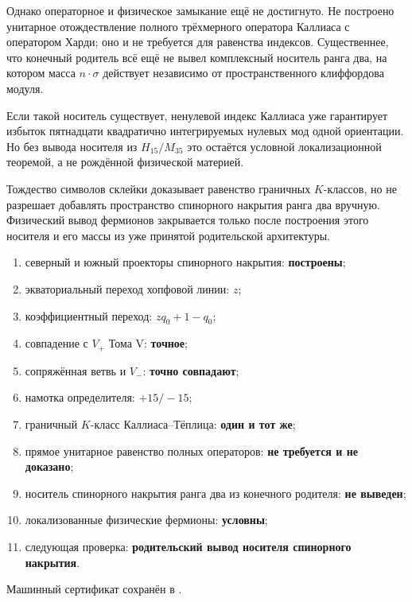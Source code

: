 Однако операторное и физическое замыкание ещё не достигнуто. Не построено
унитарное отождествление полного трёхмерного оператора Каллиаса с
оператором Харди; оно и не требуется для равенства индексов. Существеннее,
что конечный родитель всё ещё не вывел комплексный носитель ранга два, на
котором масса $n\cdot\sigma$ действует независимо от пространственного
клиффордова модуля.

Если такой носитель существует, ненулевой индекс Каллиаса уже гарантирует
избыток пятнадцати квадратично интегрируемых нулевых мод одной ориентации.
Но без вывода носителя из $H_{15}/M_{35}$ это остаётся условной
локализационной теоремой, а не рождённой физической материей.

\begin{nogocriterion}
Тождество символов склейки доказывает равенство граничных $K$-классов,
но не разрешает добавлять пространство спинорного накрытия ранга два вручную.
Физический вывод фермионов закрывается только после построения этого
носителя и его массы из уже принятой родительской архитектуры.
\end{nogocriterion}

\begin{protocol}
\begin{enumerate}
 \item северный и южный проекторы спинорного накрытия: \textbf{построены};
 \item экваториальный переход хопфовой линии: \textbf{$z$};
 \item коэффициентный переход: \textbf{$zq_0+1-q_0$};
 \item совпадение с $V_+$ Тома V: \textbf{точное};
 \item сопряжённая ветвь и $V_-$: \textbf{точно совпадают};
 \item намотка определителя: \textbf{$+15/-15$};
 \item граничный $K$-класс Каллиаса--Тёплица: \textbf{один и тот же};
 \item прямое унитарное равенство полных операторов: \textbf{не требуется и
 не доказано};
 \item носитель спинорного накрытия ранга два из конечного родителя:
 \textbf{не выведен};
 \item локализованные физические фермионы: \textbf{условны};
 \item следующая проверка: \textbf{родительский вывод носителя спинорного накрытия}.
\end{enumerate}
\end{protocol}

Машинный сертификат сохранён в
.